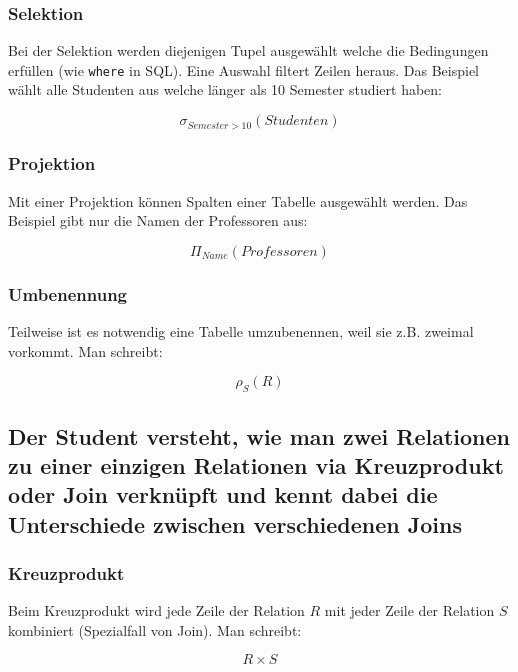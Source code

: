 \subsubsection{Selektion}

Bei der Selektion werden diejenigen Tupel ausgewählt welche die Bedingungen erfüllen (wie \verb|where| in SQL). Eine Auswahl filtert Zeilen heraus. Das Beispiel wählt alle Studenten aus welche länger als 10 Semester studiert haben:

\begin{equation}
\sigma_{Semester>10}(Studenten)
\end{equation}

\subsubsection{Projektion}

Mit einer Projektion können Spalten einer Tabelle ausgewählt werden. Das Beispiel gibt nur die Namen der Professoren aus:

\begin{equation}
\Pi_{Name}(Professoren)
\end{equation}

\subsubsection{Umbenennung}

Teilweise ist es notwendig eine Tabelle umzubenennen, weil sie z.B. zweimal vorkommt. Man schreibt:

\begin{equation}
\rho_{S}(R)
\end{equation}

\subsection{Der Student versteht, wie man zwei Relationen zu einer einzigen Relationen via Kreuzprodukt oder Join verknüpft und kennt dabei die Unterschiede zwischen verschiedenen Joins}

\subsubsection{Kreuzprodukt}

Beim Kreuzprodukt wird jede Zeile der Relation $R$ mit jeder Zeile der Relation $S$ kombiniert (Spezialfall von Join). Man schreibt:

\begin{equation}
R \times S
\end{equation}

